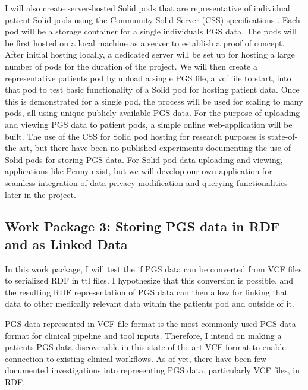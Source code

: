 \documentclass[runningheads]{llncs}
\begin{document}
I will also create server-hosted Solid pods that are representative of individual patient Solid pods using the Community Solid Server (CSS) specifications \cite{css}. 
Each pod will be a storage container for a single individual\textquotesingle s PGS data. 
The pods will be first hosted on a local machine as a server to establish a proof of concept.
After initial hosting locally, a dedicated server will be set up for hosting a large number of pods for the duration of the project. 
We will then create a representative patient\textquotesingle s pod by upload a single PGS file, a vcf file to start, into that pod to test basic functionality of a Solid pod for hosting patient data. 
Once this is demonstrated for a single pod, the process will be used for scaling to many pods, all using unique publicly available PGS data. 
For the purpose of uploading and viewing PGS data to patient pods, a simple online web-application will be built.
The use of the CSS for Solid pod hosting for research purposes is state-of-the-art, but there have been no published experiments documenting the use of Solid pods for storing PGS data. 
For Solid pod data uploading and viewing, applications like Penny \cite{penny} exist, but we will develop our own application for seamless integration of data privacy modification and querying functionalities later in the project. 


\subsection{Work Package 3:  Storing PGS data in RDF and as Linked Data}

In this work package, I will test the if PGS data can be converted from VCF files to serialized RDF in ttl files. I hypothesize that this conversion is possible, and the resulting RDF representation of PGS data can then allow for linking that data to other medically relevant data within the patient\textquotesingle s pod and outside of it.

PGS data represented in VCF file format is the most commonly used PGS data format for clinical pipeline and tool inputs. 
Therefore, I intend on making a patient\textquotesingle s PGS data discoverable in this state-of-the-art VCF format to enable connection to existing clinical workflows. 
As of yet, there have been few documented investigations into representing PGS data, particularly VCF files, in RDF. 
\end{document}
